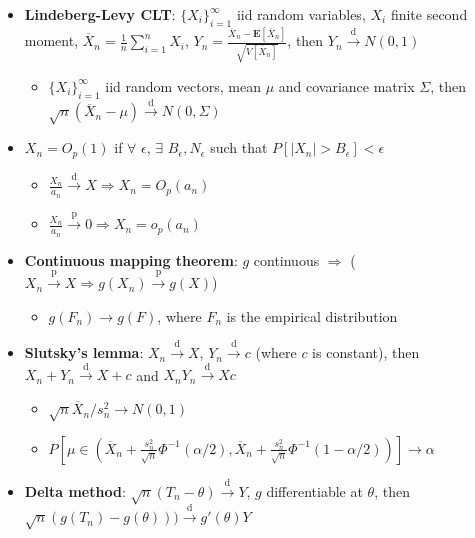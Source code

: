 \documentclass[12pt,english]{article}
\begin{document}
\begin{itemize}
	\item \textbf{Lindeberg-Levy CLT}: $\{ X_{i} \}_{i=1}^{\infty}$ iid random variables, $X_{i}$ finite second moment, $\overline{X}_{n} = \frac{1}{n} \sum_{i=1}^{n} X_{i}$, $Y_{n} = \frac{\overline{X}_{n} - \mathbf{E}[\overline{X}_{n}]}{\sqrt{V[\overline{X}_{n}]}}$, then $Y_{n} \overset{\text{d}}{\to} N(0,1)$
	\begin{itemize}
		\item $\{ X_{i} \}_{i=1}^{\infty}$ iid random vectors, mean $\mu$ and covariance matrix $\Sigma$, then $\sqrt{n} (\overline{X}_{n} - \mu) \overset{\text{d}}{\to} N(0, \Sigma)$
	\end{itemize}
	\item $X_{n} = O_{p}(1)$ if $\forall$ $\epsilon$, $\exists$ $B_{\epsilon}, N_{\epsilon}$ such that $P[|X_{n}| > B_{\epsilon}] < \epsilon$
	\begin{itemize}
		\item $\frac{X_{n}}{a_{n}} \overset{\text{d}}{\to} X \Rightarrow X_{n} = O_{p}(a_{n})$
		\item $\frac{X_{n}}{a_{n}} \overset{\text{p}}{\to} 0 \Rightarrow X_{n} = o_{p}(a_{n})$
	\end{itemize}
	\item \textbf{Continuous mapping theorem}: $g$ continuous $\Rightarrow$ ($X_{n} \overset{\text{p}}{\to} X \Rightarrow g(X_{n}) \overset{\text{p}}{\to} g(X)$)
	\begin{itemize}
		\item $g(F_{n}) \to g(F)$, where $F_{n}$ is the empirical distribution
	\end{itemize}
	\item \textbf{Slutsky's lemma}: $X_{n} \overset{\text{d}}{\to} X$, $Y_{n} \overset{\text{d}}{\to} c$ (where $c$ is constant), then $X_{n} + Y_{n} \overset{\text{d}}{\to} X + c$ and $X_{n} Y_{n} \overset{\text{d}}{\to} X c$
	\begin{itemize}
		\item $\sqrt{n} \overline{X}_{n} / s_{n}^{2} \to N(0,1)$
		\item $P\left[\mu \in \left(\overline{X}_{n} + \frac{s_{n}^{2}}{\sqrt{n}} \Phi^{-1}(\alpha/2), \overline{X}_{n} + \frac{s_{n}^{2}}{\sqrt{n}} \Phi^{-1}(1 - \alpha/2) \right)\right] \to \alpha$
	\end{itemize}
	\item \textbf{Delta method}: $\sqrt{n} (T_{n} - \theta) \overset{\text{d}}{\to} Y$, $g$ differentiable at $\theta$, then $\sqrt{n} (g(T_{n}) - g(\theta))) \overset{\text{d}}{\to} g'(\theta) Y$

\end{itemize}
\end{document}
